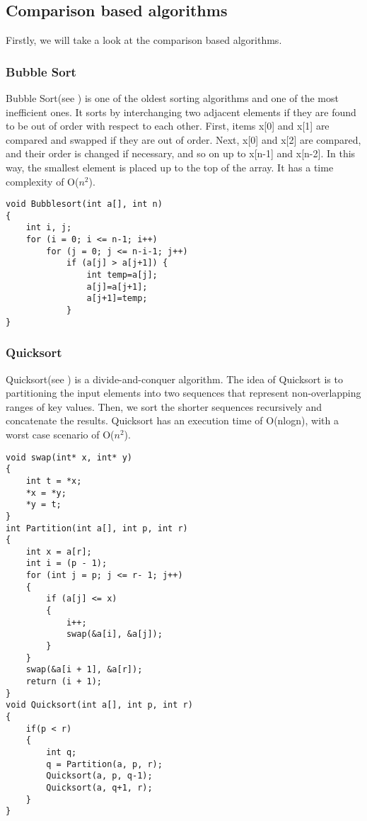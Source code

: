 \documentclass{article}
\numberwithin{figure}{section}
\begin{document}
\subsection{Comparison based algorithms}

Firstly, we will take a look at the comparison based algorithms.

\subsubsection{Bubble Sort}

Bubble Sort(see \cite{Adam}) is one of the oldest sorting algorithms and one of the most inefficient ones. It sorts by interchanging two adjacent elements if they are found to be out of order with respect to each other. First, items x[0] and x[1] are compared and swapped if they are out of order. Next, x[0] and x[2] are compared, and their order is changed if necessary, and so on up to x[n-1] and x[n-2]. In this way, the smallest element is placed up to the top of the array. It has a time complexity of O(\(n^2\)).

\begin{lstlisting}[frame=none]
void Bubblesort(int a[], int n)
{
    int i, j;
    for (i = 0; i <= n-1; i++) 
        for (j = 0; j <= n-i-1; j++) 
            if (a[j] > a[j+1]) {
                int temp=a[j];
                a[j]=a[j+1];
                a[j+1]=temp;
            }
}
\end{lstlisting}


\subsubsection{Quicksort}

Quicksort(see \cite{Thomas}\cite{Kurt}\cite{Car}) is a divide-and-conquer algorithm. The idea of Quicksort is to partitioning the input elements into two sequences that represent non-overlapping ranges of key values. Then, we sort the shorter sequences recursively and concatenate the results. Quicksort has an execution time of O(nlogn), with a worst case scenario of O(\(n^2\)).

\begin{lstlisting}[frame=none]
void swap(int* x, int* y)
{
    int t = *x;
    *x = *y;
    *y = t;
}
int Partition(int a[], int p, int r)
{
    int x = a[r];
    int i = (p - 1);
    for (int j = p; j <= r- 1; j++) 
    {
        if (a[j] <= x) 
        {
            i++;
            swap(&a[i], &a[j]);
        }
    }
    swap(&a[i + 1], &a[r]);
    return (i + 1);
}
void Quicksort(int a[], int p, int r)
{
    if(p < r) 
    {
        int q;
        q = Partition(a, p, r);
        Quicksort(a, p, q-1);
        Quicksort(a, q+1, r);
    }
}
\end{lstlisting}
\end{document}
